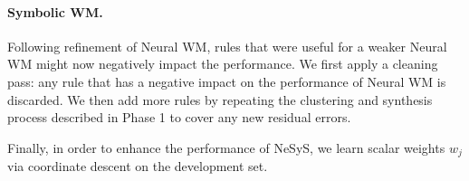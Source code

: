 \documentclass{article}
\theoremstyle{plain}
\theoremstyle{definition}
\theoremstyle{remark}
\newcommand{\ours}{{\sc NeSyS}\xspace}
\begin{document}


\paragraph{Symbolic WM.}
Following refinement of Neural WM, rules that were useful for a weaker Neural WM might now negatively impact the performance. We first apply a cleaning pass: any rule that has a negative impact on the performance of Neural WM is discarded. We then add more rules by repeating the clustering and synthesis process described in Phase 1 to cover any new residual errors.

Finally, in order to enhance the performance of \ours, we learn scalar weights $w_j$ via coordinate descent on the development set.
\end{document}
